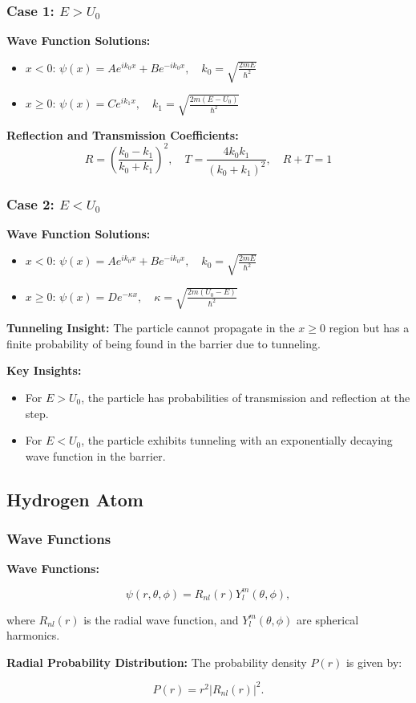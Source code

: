 \documentclass{article}
\newcommand{\eqbox}[1]{\begin{tcolorbox}[colback=gray!10] #1 \end{tcolorbox}}
\newcommand{\conceptbox}[1]{\begin{tcolorbox}[colback=blue!10] #1 \end{tcolorbox}}
\begin{document}
\conceptbox{
\subsubsection*{Case 1: \( E > U_0 \)}

\textbf{Wave Function Solutions:}
\begin{itemize}
    \item \( x < 0 \): \( \psi(x) = Ae^{ik_0x} + Be^{-ik_0x}, \quad k_0 = \sqrt{\frac{2mE}{\hbar^2}} \)
    \item \( x \geq 0 \): \( \psi(x) = Ce^{ik_1x}, \quad k_1 = \sqrt{\frac{2m(E - U_0)}{\hbar^2}} \)
\end{itemize}

\textbf{Reflection and Transmission Coefficients:}
\[
R = \left( \frac{k_0 - k_1}{k_0 + k_1} \right)^2, \quad T = \frac{4k_0k_1}{(k_0 + k_1)^2}, \quad R + T = 1
\]
}


\conceptbox{
\subsubsection*{Case 2: \( E < U_0 \)}
\textbf{Wave Function Solutions:}
\begin{itemize}
    \item \( x < 0 \): \( \psi(x) = Ae^{ik_0x} + Be^{-ik_0x}, \quad k_0 = \sqrt{\frac{2mE}{\hbar^2}} \)
    \item \( x \geq 0 \): \( \psi(x) = De^{-\kappa x}, \quad \kappa = \sqrt{\frac{2m(U_0 - E)}{\hbar^2}} \)
\end{itemize}

\textbf{Tunneling Insight:}
The particle cannot propagate in the \( x \geq 0 \) region but has a finite probability of being found in the barrier due to tunneling.
}

\conceptbox{
\textbf{Key Insights:}
\begin{itemize}
    \item For \( E > U_0 \), the particle has probabilities of transmission and reflection at the step.
    \item For \( E < U_0 \), the particle exhibits tunneling with an exponentially decaying wave function in the barrier.
\end{itemize}
}


\subsection{Hydrogen Atom}

\subsubsection{Wave Functions}
\conceptbox{
\textbf{Wave Functions:}
\eqbox{
\[
\psi(r, \theta, \phi) = R_{nl}(r)Y_l^m(\theta, \phi),
\]}
where \( R_{nl}(r) \) is the radial wave function, and \( Y_l^m(\theta, \phi) \) are spherical harmonics.

\textbf{Radial Probability Distribution:}
The probability density \( P(r) \) is given by:
\eqbox{
\[
P(r) = r^2|R_{nl}(r)|^2.
\]}
}
\end{document}
